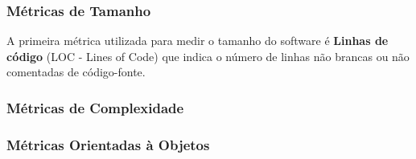 \subsubsection{Métricas de Tamanho}
\label{metrica tamanho} 

A primeira métrica utilizada para medir o tamanho do software é \textbf{Linhas de código}   (LOC - Lines of Code) que indica o número de linhas não brancas ou não comentadas de código-fonte. 

\subsubsection {Métricas de Complexidade}
\label {metrica complexidade}


\subsubsection{Métricas Orientadas à Objetos}
\label{metrica objetos}






